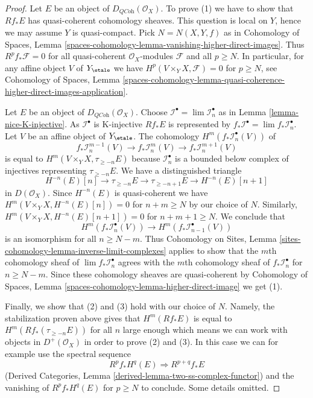 \begin{proof}
Let $E$ be an object of $D_{\textit{QCoh}}(\mathcal{O}_X)$.
To prove (1) we have to show that $Rf_*E$ has quasi-coherent
cohomology sheaves. This question is local on $Y$, hence we may
assume $Y$ is quasi-compact. Pick $N = N(X, Y, f)$ as in
Cohomology of Spaces, Lemma
\ref{spaces-cohomology-lemma-vanishing-higher-direct-images}.
Thus $R^pf_*\mathcal{F} = 0$ for all quasi-coherent $\mathcal{O}_X$-modules
$\mathcal{F}$ and all $p \geq N$. In particular, for any affine
object $V$ of $Y_\etale$ we have $H^p(V \times_Y X, \mathcal{F}) = 0$
for $p \geq N$, see
Cohomology of Spaces, Lemma
\ref{spaces-cohomology-lemma-quasi-coherence-higher-direct-images-application}.

\medskip\noindent
Let $E$ be an object of $D_{\textit{QCoh}}(\mathcal{O}_X)$.
Choose $\mathcal{I}^\bullet = \lim \mathcal{I}_n^\bullet$
as in Lemma \ref{lemma-nice-K-injective}.
As $\mathcal{I}^\bullet$ is K-injective $Rf_*E$ is represented by
$f_*\mathcal{I}^\bullet = \lim f_*\mathcal{I}_n^\bullet$.
Let $V$ be an affine object of $Y_\etale$. The cohomology
$H^m(f_*\mathcal{I}_n^\bullet(V))$ of
$$
f_*\mathcal{I}_n^{m - 1}(V) \to
f_*\mathcal{I}_n^m(V) \to
f_*\mathcal{I}_n^{m + 1}(V)
$$
is equal to $H^m(V \times_Y X, \tau_{\geq -n}E)$ because
$\mathcal{I}_n^\bullet$ is a bounded below complex of injectives
representing $\tau_{\geq -n}E$. We have a distinguished triangle
$$
H^{-n}(E)[n] \to \tau_{\geq -n}E \to \tau_{\geq - n + 1}E \to H^{-n}(E)[n + 1]
$$
in $D(\mathcal{O}_X)$. Since $H^{-n}(E)$ is quasi-coherent we have
$H^m(V \times_Y X, H^{-n}(E)[n]) = 0$ for $n + m \geq N$ by
our choice of $N$. Similarly, $H^m(V \times_Y X, H^{-n}(E)[n + 1]) = 0$
for $n + m + 1 \geq N$. We conclude that
$$
H^m(f_*\mathcal{I}_n^\bullet(V)) \to H^m(f_*\mathcal{I}_{n - 1}^\bullet(V))
$$
is an isomorphism for all $n \geq N - m$. Thus
Cohomology on Sites, Lemma \ref{sites-cohomology-lemma-inverse-limit-complexes}
applies to show that the $m$th cohomology sheaf of
$\lim f_*\mathcal{I}_n^\bullet$ agrees with the $m$th cohomology
sheaf of $f_*\mathcal{I}_n^\bullet$ for $n \geq N - m$. Since these
cohomology sheaves are quasi-coherent by
Cohomology of Spaces, Lemma \ref{spaces-cohomology-lemma-higher-direct-image}
we get (1).

\medskip\noindent
Finally, we show that (2) and (3) hold with our choice of $N$.
Namely, the stabilization proven above gives that $H^m(Rf_*E)$ is equal
to $H^m(Rf_*(\tau_{\geq -n}E))$ for all $n$ large enough which means we
can work with objects in $D^+(\mathcal{O}_X)$ in order to prove (2) and (3).
In this case we can for example use the spectral sequence
$$
R^pf_*H^q(E) \Rightarrow R^{p + q}f_*E
$$
(Derived Categories, Lemma \ref{derived-lemma-two-ss-complex-functor})
and the vanishing of $R^pf_*H^q(E)$ for $p \geq N$ to conclude.
Some details omitted.
\end{proof}


